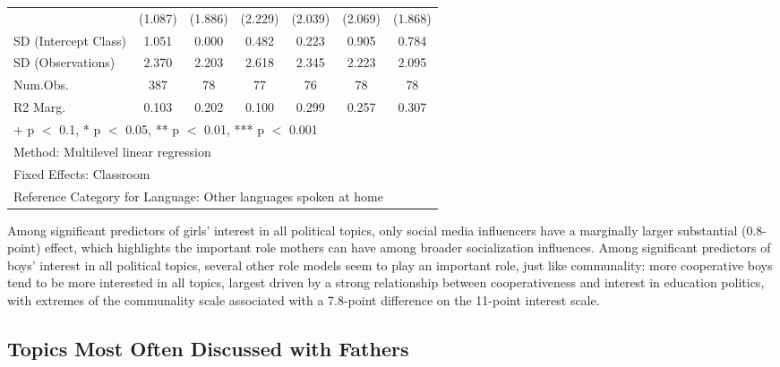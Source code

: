 \documentclass[
  letterpaper,
  DIV=11,
  numbers=noendperiod]{scrreprt}
\begin{document}
\begin{table}
\begin{tabular}[t]{lcccccc}
\hspace{1em} & (1.087) & (1.886) & (2.229) & (2.039) & (2.069) & (1.868)\\
\hspace{1em}SD (Intercept Class) & 1.051 & 0.000 & 0.482 & 0.223 & 0.905 & 0.784\\
\hspace{1em}SD (Observations) & 2.370 & 2.203 & 2.618 & 2.345 & 2.223 & 2.095\\
\hspace{1em}Num.Obs. & 387 & 78 & 77 & 76 & 78 & 78\\
\hspace{1em}R2 Marg. & 0.103 & 0.202 & 0.100 & 0.299 & 0.257 & 0.307\\
\bottomrule
\multicolumn{7}{l}{\rule{0pt}{1em}+ p $<$ 0.1, * p $<$ 0.05, ** p $<$ 0.01, *** p $<$ 0.001}\\
\multicolumn{7}{l}{\rule{0pt}{1em}Method: Multilevel linear regression}\\
\multicolumn{7}{l}{\rule{0pt}{1em}Fixed Effects: Classroom}\\
\multicolumn{7}{l}{\rule{0pt}{1em}Reference Category for Language: Other languages spoken at home}\\
\end{tabular}
\end{table}

Among significant predictors of girls' interest in all political topics,
only social media influencers have a marginally larger substantial
(0.8-point) effect, which highlights the important role mothers can have
among broader socialization influences. Among significant predictors of
boys' interest in all political topics, several other role models seem
to play an important role, just like communality: more cooperative boys
tend to be more interested in all topics, largest driven by a strong
relationship between cooperativeness and interest in education politics,
with extremes of the communality scale associated with a 7.8-point
difference on the 11-point interest scale.

\subsection{Topics Most Often Discussed with
Fathers}\label{topics-most-often-discussed-with-fathers}
\end{document}
